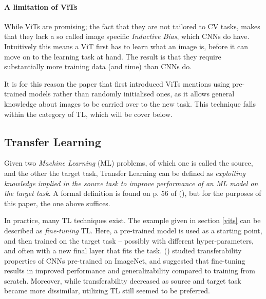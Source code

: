 \paragraph{A limitation of ViTs}
While ViTs are promising; the fact that they are not tailored to CV tasks, makes that they lack a so called image specific \textit{Inductive Bias}, which CNNs do have. Intuitively this means a ViT first has to learn what an image is, before it can move on to the learning task at hand. The result is that they require substantially more training data (and time) than CNNs do. 

It is for this reason the paper that first introduced ViTs \citep{dosovitskiy2020image} mentions using pre-trained models rather than randomly initialised ones, as it allows general knowledge about images to be carried over to the new task. This technique falls within the category of TL, which will be cover below. 


\subsection{Transfer Learning}
Given two \textit{Machine Learning} (ML) problems, of which one is called the source, and the other the target task, Transfer Learning can be defined as \textit{exploiting knowledge implied in the source task to improve performance of an ML model on the target task}. A formal definition is found on p. 56 of \citeauthor{sabatelli2022contributions} (\citeyear{sabatelli2022contributions}), but for the purposes of this paper, the one above suffices.

In practice, many TL techniques exist. The example given in section \ref{vits} can be described as \textit{fine-tuning} TL. Here, a pre-trained model is used as a starting point, and then trained on the target task -- possibly with different hyper-parameters, and often with a new final layer that fits the task. \citeauthor{yosinski2014transferable} (\citeyear{yosinski2014transferable}) studied transferability properties of CNNs pre-trained on ImageNet, and suggested that fine-tuning results in improved performance and generalizability compared to training from scratch. Moreover, while transferability decreased as source and target task became more dissimilar, utilizing TL still seemed to be preferred.

